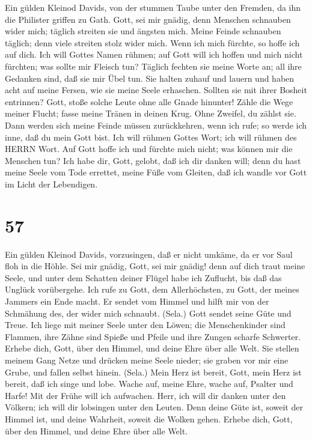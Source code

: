  Ein gülden Kleinod Davids, von der stummen Taube unter den
Fremden, da ihn die Philister griffen zu Gath. Gott, sei mir gnädig,
denn Menschen schnauben wider mich; täglich streiten sie und ängsten
mich.  Meine Feinde schnauben täglich; denn viele streiten
stolz wider mich.  Wenn ich mich fürchte, so hoffe ich auf
dich.  Ich will Gottes Namen rühmen; auf Gott will ich
hoffen und mich nicht fürchten; was sollte mir Fleisch tun? 
Täglich fechten sie meine Worte an; all ihre Gedanken sind, daß sie mir
Übel tun.  Sie halten zuhauf und lauern und haben acht auf
meine Fersen, wie sie meine Seele erhaschen.  Sollten sie
mit ihrer Bosheit entrinnen? Gott, stoße solche Leute ohne alle Gnade
hinunter!  Zähle die Wege meiner Flucht; fasse meine Tränen
in deinen Krug. Ohne Zweifel, du zählst sie.  Dann werden
sich meine Feinde müssen zurückkehren, wenn ich rufe; so werde ich inne,
daß du mein Gott bist.  Ich will rühmen Gottes Wort; ich
will rühmen des HERRN Wort.  Auf Gott hoffe ich und fürchte
mich nicht; was können mir die Menschen tun?  Ich habe dir,
Gott, gelobt, daß ich dir danken will;  denn du hast meine
Seele vom Tode errettet, meine Füße vom Gleiten, daß ich wandle vor Gott
im Licht der Lebendigen.

\hypertarget{section-56}{%
\section{57}\label{section-56}}

 Ein gülden Kleinod Davids, vorzusingen, daß er nicht
umkäme, da er vor Saul floh in die Höhle. Sei mir gnädig, Gott, sei mir
gnädig! denn auf dich traut meine Seele, und unter dem Schatten deiner
Flügel habe ich Zuflucht, bis daß das Unglück vorübergehe. 
Ich rufe zu Gott, dem Allerhöchsten, zu Gott, der meines Jammers ein
Ende macht.  Er sendet vom Himmel und hilft mir von der
Schmähung des, der wider mich schnaubt. (Sela.) Gott sendet seine Güte
und Treue.  Ich liege mit meiner Seele unter den Löwen; die
Menschenkinder sind Flammen, ihre Zähne sind Spieße und Pfeile und ihre
Zungen scharfe Schwerter.  Erhebe dich, Gott, über den
Himmel, und deine Ehre über alle Welt.  Sie stellen meinem
Gang Netze und drücken meine Seele nieder; sie graben vor mir eine
Grube, und fallen selbst hinein. (Sela.)  Mein Herz ist
bereit, Gott, mein Herz ist bereit, daß ich singe und lobe. 
Wache auf, meine Ehre, wache auf, Psalter und Harfe! Mit der Frühe will
ich aufwachen.  Herr, ich will dir danken unter den Völkern;
ich will dir lobsingen unter den Leuten.  Denn deine Güte
ist, soweit der Himmel ist, und deine Wahrheit, soweit die Wolken gehen.
 Erhebe dich, Gott, über den Himmel, und deine Ehre über
alle Welt.


